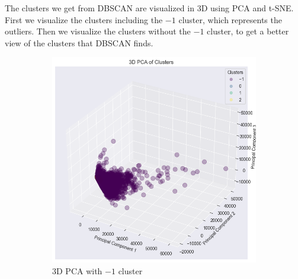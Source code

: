 The clusters we get from DBSCAN are visualized in 3D using PCA and t-SNE. First we visualize the clusters including the $-1$ cluster, which represents the outliers. Then we visualize the clusters without the $-1$ cluster, to get a better view of the clusters that DBSCAN finds.

\begin{figure}[H]
    \hspace*{\fill}
    \centering
    \begin{subfigure}[b]{0.45\textwidth}
        \centering
        \includegraphics[width=1.0\textwidth]{src/figs/3d_PCA_DBSCAN_with.png} 
        \caption{3D PCA with $-1$ cluster}\label{fig:DBSCAN_PCA_with}
    \end{subfigure}
    \hfill
    \begin{subfigure}[b]{0.45\textwidth}
        \centering

\end{subfigure}
\end{figure}
